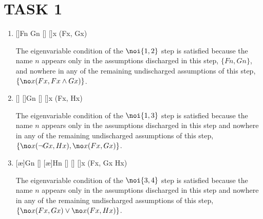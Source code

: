\section*{TASK 1}

\begin{enumerate}
\item
\begin{prooftree*}
[\ai]{Fn \land Gn}
[\noe]{\bot}
[]{\no x (Fx, Gx)}
\end{prooftree*}
The eigenvariable condition of the $\noi{1,2}$ step is satisfied because the name $n$ appears only in the assumptions discharged in this step, $\{ Fn, Gn \}$, and nowhere in any of the remaining undischarged assumptions of this step, $\{ \no x (Fx, Fx \land Gx) \}$.

\item
\begin{prooftree*}
[\noe]{\bot}
[]{\neg Gn}
[\noe]{\bot}
[]{\no x (Fx, Hx)}
\end{prooftree*}
The eigenvariable condition of the $\noi{1,3}$ step is satisfied because the name $n$ appears only in the assumptions discharged in this step and nowhere in any of the remaining undischarged assumptions of this step, $\{ \no x (\neg Gx, Hx), \no x (Fx, Gx) \}$.

\item
\begin{prooftree*}
\fontsize{5}{6}\selectfont
{}
[\ae]{Gn}
[\noe]{\bot}
[\ae]{Hn}
[\noe]{\bot}
[]{\bot}
[]{\no x (Fx, Gx \land Hx)}
\end{prooftree*}
The eigenvariable condition of the $\noi{3,4}$ step is satisfied because the name $n$ appears only in the assumptions discharged in this step and nowhere in any of the remaining undischarged assumptions of this step, $\{ \no x (Fx, Gx) \lor \no x (Fx, Hx) \}$.

\end{enumerate}